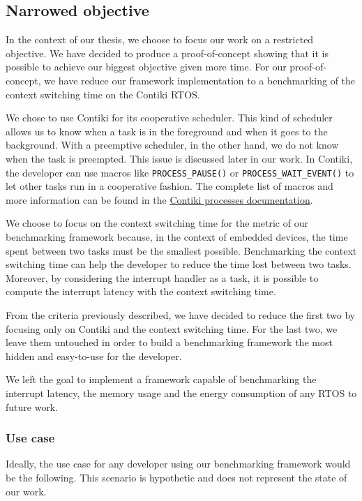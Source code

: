 \subsection{Narrowed objective}

In the context of our thesis, we choose to focus our work on a restricted objective.
We have decided to produce a proof-of-concept showing that it is possible to achieve our biggest objective given more time.
For our proof-of-concept, we have reduce our framework implementation to a benchmarking of the context switching time on the Contiki RTOS.

We chose to use Contiki for its cooperative scheduler.
This kind of scheduler allows us to know when a task is in the foreground and when it goes to the background.
With a preemptive scheduler, in the other hand, we do not know when the task is preempted.
This issue is discussed later in our work.
In Contiki, the developer can use macros like \texttt{PROCESS\_PAUSE()} or \texttt{PROCESS\_WAIT\_EVENT()} to let other tasks run in a cooperative fashion.
The complete list of macros and more information can be found in the \href{https://github.com/contiki-os/contiki/wiki/Processes}{Contiki processes documentation}.

We choose to focus on the context switching time for the metric of our benchmarking framework because, in the context of embedded devices, the time spent between two tasks must be the smallest possible.
Benchmarking the context switching time can help the developer to reduce the time lost between two tasks.
Moreover, by considering the interrupt handler as a task, it is possible to compute the interrupt latency with the context switching time.

From the criteria previously described, we have decided to reduce the first two by focusing only on Contiki and the context switching time.
For the last two, we leave them untouched in order to build a benchmarking framework the most hidden and easy-to-use for the developer.

We left the goal to implement a framework capable of benchmarking the interrupt latency, the memory usage and the energy consumption of any RTOS to future work.

\subsubsection{Use case}
Ideally, the use case for any developer using our benchmarking framework would be the following.
This scenario is hypothetic and does not represent the state of our work.


